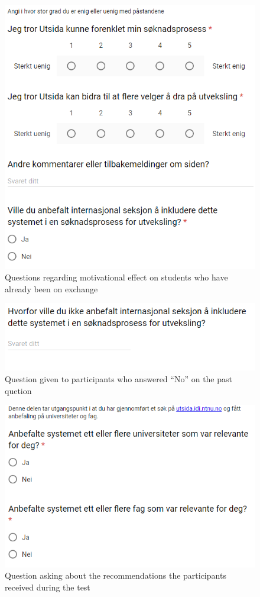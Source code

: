 \begin{figure}[h]
    \centering
    \includegraphics[width=1\textwidth]{fig/form2/s4.PNG}
    \caption{Questions regarding motivational effect on students who have already been on exchange}
    \label{fig:my_label}
\end{figure}
\begin{figure}[h]
    \centering
    \includegraphics[width=1\textwidth]{fig/form2/s5.PNG}
    \caption{Question given to participants who answered \enquote{No} on the past quetion}
    \label{fig:my_label}
\end{figure}
\begin{figure}[h]
    \centering
    \includegraphics[width=1\textwidth]{fig/form2/s6.PNG}
    \caption{Question asking about the recommendations the participants received during the test}
    \label{fig:my_label}
\end{figure}
